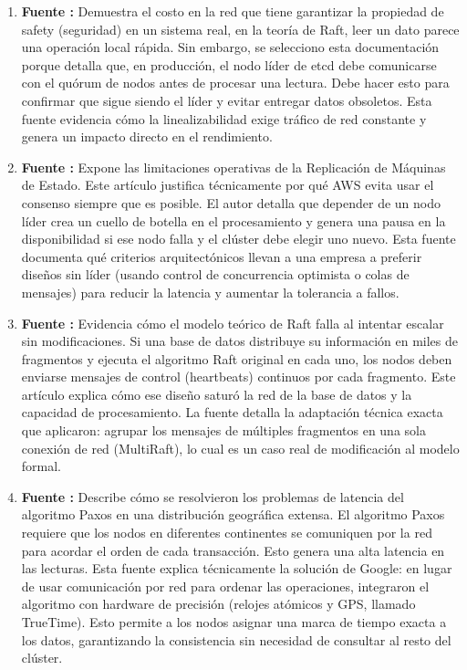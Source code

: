 \documentclass[12pt,letterpaper]{article}
\begin{document}
\begin{enumerate}
    \item \textbf{Fuente \cite{etcd2021}:} Demuestra el costo en la red que tiene garantizar la propiedad de safety (seguridad) en un sistema real, en la teoría de Raft, leer un dato parece una operación local rápida. Sin embargo, se selecciono esta documentación porque detalla que, en producción, el nodo líder de etcd debe comunicarse con el quórum de nodos antes de procesar una lectura. Debe hacer esto para confirmar que sigue siendo el líder y evitar entregar datos obsoletos. Esta fuente evidencia cómo la linealizabilidad exige tráfico de red constante y genera un impacto directo en el rendimiento.
    \item \textbf{Fuente \cite{brooker2020}:} Expone las limitaciones operativas de la Replicación de Máquinas de Estado. Este artículo justifica técnicamente por qué AWS evita usar el consenso siempre que es posible. El autor detalla que depender de un nodo líder crea un cuello de botella en el procesamiento y genera una pausa en la disponibilidad si ese nodo falla y el clúster debe elegir uno nuevo. Esta fuente documenta qué criterios arquitectónicos llevan a una empresa a preferir diseños sin líder (usando control de concurrencia optimista o colas de mensajes) para reducir la latencia y aumentar la tolerancia a fallos.

     \item \textbf{Fuente \cite{cockroach2015}:}  Evidencia cómo el modelo teórico de Raft falla al intentar escalar sin modificaciones. Si una base de datos distribuye su información en miles de fragmentos y ejecuta el algoritmo Raft original en cada uno, los nodos deben enviarse mensajes de control (heartbeats) continuos por cada fragmento. Este artículo explica cómo ese diseño saturó la red de la base de datos y la capacidad de procesamiento. La fuente detalla la adaptación técnica exacta que aplicaron: agrupar los mensajes de múltiples fragmentos en una sola conexión de red (MultiRaft), lo cual es un caso real de modificación al modelo formal.
    \item \textbf{Fuente \cite{srivastava2023}:} Describe cómo se resolvieron los problemas de latencia del algoritmo Paxos en una distribución geográfica extensa. El algoritmo Paxos requiere que los nodos en diferentes continentes se comuniquen por la red para acordar el orden de cada transacción. Esto genera una alta latencia en las lecturas. Esta fuente explica técnicamente la solución de Google: en lugar de usar comunicación por red para ordenar las operaciones, integraron el algoritmo con hardware de precisión (relojes atómicos y GPS, llamado TrueTime). Esto permite a los nodos asignar una marca de tiempo exacta a los datos, garantizando la consistencia sin necesidad de consultar al resto del clúster.
\end{enumerate}
\end{document}
